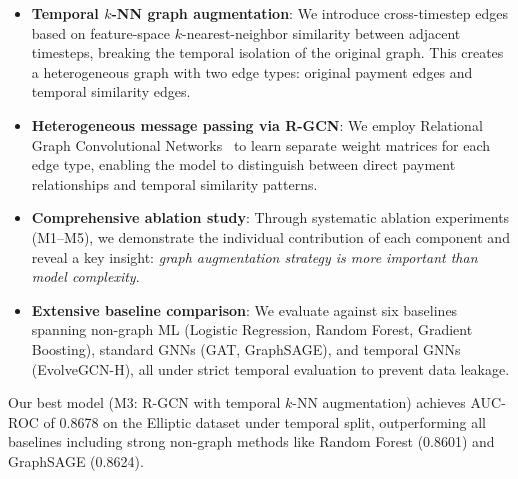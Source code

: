 \begin{itemize}
    \item \textbf{Temporal $k$-NN graph augmentation}: We introduce cross-timestep edges based on feature-space $k$-nearest-neighbor similarity between adjacent timesteps, breaking the temporal isolation of the original graph. This creates a heterogeneous graph with two edge types: original payment edges and temporal similarity edges.

    \item \textbf{Heterogeneous message passing via R-GCN}: We employ Relational Graph Convolutional Networks~\cite{schlichtkrull2018modeling} to learn separate weight matrices for each edge type, enabling the model to distinguish between direct payment relationships and temporal similarity patterns.

    \item \textbf{Comprehensive ablation study}: Through systematic ablation experiments (M1--M5), we demonstrate the individual contribution of each component and reveal a key insight: \emph{graph augmentation strategy is more important than model complexity}.

    \item \textbf{Extensive baseline comparison}: We evaluate against six baselines spanning non-graph ML (Logistic Regression, Random Forest, Gradient Boosting), standard GNNs (GAT, GraphSAGE), and temporal GNNs (EvolveGCN-H), all under strict temporal evaluation to prevent data leakage.
\end{itemize}

Our best model (M3: R-GCN with temporal $k$-NN augmentation) achieves AUC-ROC of 0.8678 on the Elliptic dataset under temporal split, outperforming all baselines including strong non-graph methods like Random Forest (0.8601) and GraphSAGE (0.8624).
